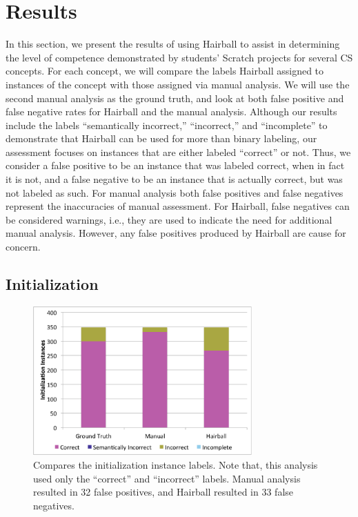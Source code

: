 \section{Results}

In this section, we present the results of using Hairball to assist in
determining the level of competence demonstrated by students' Scratch projects
for several CS concepts. For each concept, we will compare the labels Hairball
assigned to instances of the concept with those assigned via manual
analysis. We will use the second manual analysis as the ground truth, and look
at both false positive and false negative rates for Hairball and the manual
analysis. Although our results include the labels ``semantically incorrect,''
``incorrect,'' and ``incomplete'' to demonstrate that Hairball can be used for
more than binary labeling, our assessment focuses on instances that are either
labeled ``correct'' or not. Thus, we consider a false positive to be an
instance that was labeled correct, when in fact it is not, and a false negative
to be an instance that is actually correct, but was not labeled as such. For
manual analysis both false positives and false negatives represent the
inaccuracies of manual assessment. For Hairball, false negatives can be
considered warnings, i.e., they are used to indicate the need for additional
manual analysis. However, any false positives produced by Hairball are cause
for concern.


\subsection{Initialization}
\begin{figure}[!t]
\centering \includegraphics[trim=.3in .15in .3in .15in, clip,
  width=3.3in]{graphs/AutoInit.eps}
\caption{Compares the initialization instance labels. Note that, this analysis
  used only the ``correct'' and ``incorrect'' labels. Manual analysis resulted
  in 32 false positives, and Hairball resulted in 33 false negatives.}
\end{figure}

